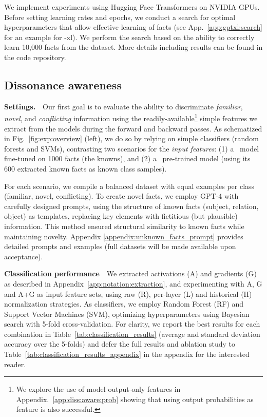 We implement experiments using Hugging Face Transformers on NVIDIA GPUs. Before setting learning rates and epochs, we conduct a search for optimal hyperparameters that allow effective learning of facts (see App.~\ref{app:gptxl:search} for an example for \gpttwo-xl). We perform the search based on the ability to correctly learn 10,000 facts from the dataset. %
More details including results can be found in the code repository.


\subsection{Dissonance awareness}\label{sec:classify}

\textbf{Settings.}\ \  Our first goal is to evaluate the ability to discriminate \textit{familiar}, \textit{novel}, and\textit{ conflicting} information using the readily-available\footnote{We explore the use of model output-only features in Appendix.~\ref{app:diss:aware:prob} showing that using output probabilities as feature is also successful.} simple features we extract from the models during the forward and backward passes. As schematized in Fig.~\ref{fig:exp:overview} (left), we do so by relying on simple classifiers (random forests and SVMs), contrasting two scenarios for the \textit{input features}: (1) a \gpttwo\ model fine-tuned on 1000 facts (the knowns), and (2) a \gpttwo\ pre-trained model  (using its 600 extracted known facts as known class samples). 

For each scenario, we compile a balanced dataset with equal examples per class (familiar, novel, conflicting). 
To create novel facts, we employ GPT-4 with carefully designed prompts, using the structure of known facts (subject, relation, object) as templates, replacing key elements with fictitious (but plausible) information. This method ensured structural similarity to known facts while maintaining novelty. Appendix \ref{appendix:unknown_facts_prompt} provides detailed prompts and examples (full datasets will be made available upon acceptance).

\textbf{Classification performance}\ \  We extracted activations (A) and gradients (G) as described in Appendix~\ref{app:notation:extraction}, 
and experimenting with A, G and A+G as input feature sets, using raw (R), per-layer (L) and historical (H) normalization strategies. As classifiers, we employ Random Forest (RF) and Support Vector Machines (SVM), optimizing hyperparameters using Bayesian search with 5-fold cross-validation.  For clarity, we report the best results for each combination in Table~\ref{tab:classification_results}
(average and standard deviation accuracy over the 5-folds) 
and defer the full results and ablation study to Table~\ref{tab:classification_results_appendix} in the appendix for the interested reader.


